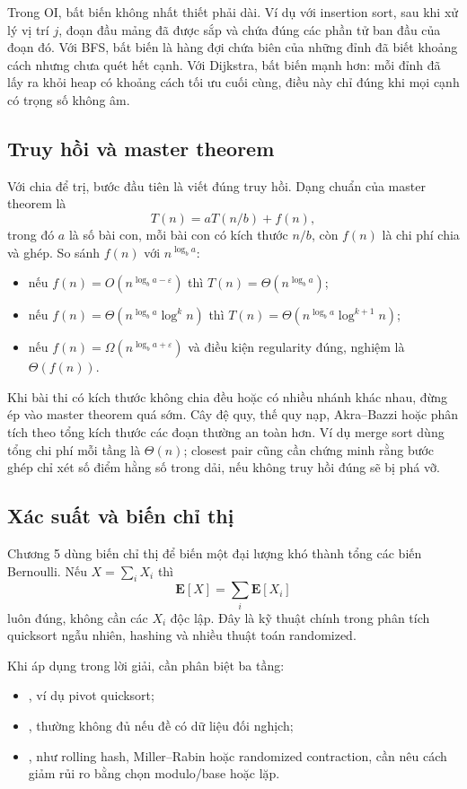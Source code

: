 \documentclass[11pt]{article}
\begin{document}
Trong OI, bất biến không nhất thiết phải dài. Ví dụ với insertion sort, sau khi
xử lý vị trí \(j\), đoạn đầu mảng đã được sắp và chứa đúng các phần tử ban đầu
của đoạn đó. Với BFS, bất biến là hàng đợi chứa biên của những đỉnh đã biết
khoảng cách nhưng chưa quét hết cạnh. Với Dijkstra, bất biến mạnh hơn: mỗi đỉnh
đã lấy ra khỏi heap có khoảng cách tối ưu cuối cùng, điều này chỉ đúng khi mọi
cạnh có trọng số không âm.

\subsection{Truy hồi và master theorem}

Với chia để trị, bước đầu tiên là viết đúng truy hồi. Dạng chuẩn của master
theorem là
\[
  T(n)=aT(n/b)+f(n),
\]
trong đó \(a\) là số bài con, mỗi bài con có kích thước \(n/b\), còn \(f(n)\)
là chi phí chia và ghép. So sánh \(f(n)\) với \(n^{\log_b a}\):
\begin{itemize}
  \item nếu \(f(n)=O(n^{\log_b a-\varepsilon})\) thì
        \(T(n)=\Theta(n^{\log_b a})\);
  \item nếu \(f(n)=\Theta(n^{\log_b a}\log^k n)\) thì
        \(T(n)=\Theta(n^{\log_b a}\log^{k+1} n)\);
  \item nếu \(f(n)=\Omega(n^{\log_b a+\varepsilon})\) và điều kiện regularity
        đúng, nghiệm là \(\Theta(f(n))\).
\end{itemize}

Khi bài thi có kích thước không chia đều hoặc có nhiều nhánh khác nhau, đừng ép
vào master theorem quá sớm. Cây đệ quy, thế quy nạp, Akra--Bazzi hoặc phân tích
theo tổng kích thước các đoạn thường an toàn hơn. Ví dụ merge sort dùng tổng
chi phí mỗi tầng là \(\Theta(n)\); closest pair cũng cần chứng minh rằng bước
ghép chỉ xét số điểm hằng số trong dải, nếu không truy hồi đúng sẽ bị phá vỡ.

\subsection{Xác suất và biến chỉ thị}

Chương 5 dùng biến chỉ thị để biến một đại lượng khó thành tổng các biến
Bernoulli. Nếu \(X=\sum_i X_i\) thì
\[
  \mathbf{E}[X]=\sum_i \mathbf{E}[X_i]
\]
luôn đúng, không cần các \(X_i\) độc lập. Đây là kỹ thuật chính trong phân tích
quicksort ngẫu nhiên, hashing và nhiều thuật toán randomized.

Khi áp dụng trong lời giải, cần phân biệt ba tầng:
\begin{itemize}
  \item {}, ví dụ pivot quicksort;
  \item {}, thường không đủ nếu đề có dữ liệu
        đối nghịch;
  \item {}, như rolling hash, Miller--Rabin hoặc randomized
        contraction, cần nêu cách giảm rủi ro bằng chọn modulo/base hoặc lặp.
\end{itemize}
\end{document}
